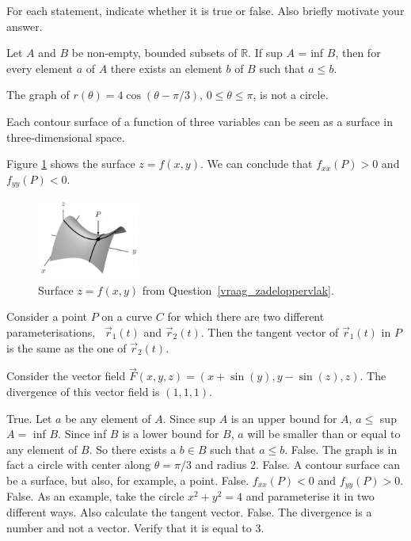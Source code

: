 \begin{Exercise} %
For each statement, indicate whether it is true or false. Also briefly motivate your answer.

\Question Let $A$ and $B$ be non-empty, bounded subsets of $\mathbb{R}$. If sup $A$ = inf $B$, then for every element $a$ of $A$ there exists an element $b$ of $B$ such that $a \leq b$.
	
\Question The graph of $r\left(\theta\right)=4\cos(\theta-\pi/3)$, $0\leq\theta\leq\pi$, is not a circle.
	
\Question Each contour surface of a function of three variables can be seen as a surface in three-dimensional space. 
	
\Question Figure \ref{fig_zadeloppervlak} shows the surface $z=f(x,y)$. We can conclude that $f_{xx}(P) >0$ and $f_{yy}(P) <0$. \label{vraag_zadeloppervlak}
	 \begin{figure}[H]
		\centering
		\centerline{
			\includegraphics[width=0.3\textwidth]{zadelopp}
		}
		\caption{Surface $z=f(x,y)$ from Question~\ref{vraag_zadeloppervlak}.}
		\label{fig_zadeloppervlak}
	\end{figure}
	
\Question Consider a point $P$ on a curve $C$ for which there are two different parameterisations, \ $\vec{r}_1(t)$ and $\vec{r}_2(t)$. Then the tangent vector of $\vec{r}_1(t)$ in $P$ is the same as the one of $\vec{r}_2(t)$.
	
\Question Consider the vector field $\vec{F}(x,y,z) = (x+\sin(y), y - \sin(z), z)$. The divergence of this vector field is $(1,1,1)$.
\EndCurrentQuestion
\end{Exercise}

\begin{Answer}

\Question True. Let $a$ be any element of $A$. Since sup $A$ is an upper bound for $A$, $a \leq$ sup $A = $ inf $B$. Since inf $B$ is a lower bound for $B$, $a$ will be smaller than or equal to any element of $B$. So there exists a $b \in B$ such that $a \leq b$.
\Question False. The graph is in fact a circle with center along $\theta = \pi/3$ and radius 2.
\Question False. A contour surface can be a surface, but also, for example, a point. 
\Question False. $f_{xx}(P) <0$ and $f_{yy}(P) > 0$.
\Question False. As an example, take the circle $x^2 + y^2 = 4$ and parameterise it in two different ways. Also calculate the tangent vector.
\Question False. The divergence is a number and not a vector. Verify that it is equal to 3.
\end{Answer}



